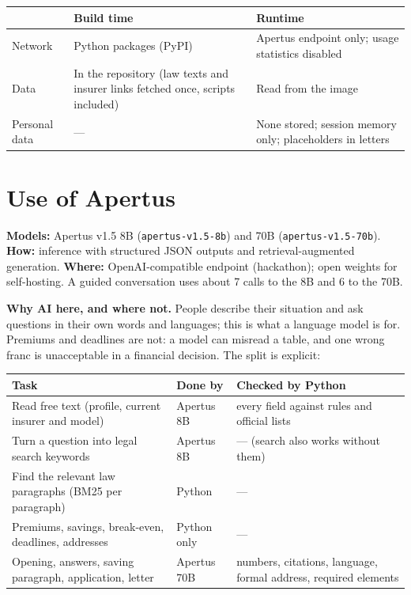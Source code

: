 \documentclass[10pt,a4paper]{article}
\newcommand{\entete}[1]{\textsf{\bfseries\footnotesize #1}}
\newcommand{\gras}[1]{\textbf{#1}}
\begin{document}
\begin{table}[htb]
\begin{tabularx}{\textwidth}{@{}lYY@{}}
\toprule
 & \entete{Build time} & \entete{Runtime} \\
\midrule
Network & Python packages (PyPI) & Apertus endpoint only; usage statistics disabled \\
Data & In the repository (law texts and insurer links fetched once, scripts included) & Read from the image \\
Personal data & — & None stored; session memory only; placeholders in letters \\
\bottomrule
\end{tabularx}
\end{table}

\section{Use of Apertus}

\textbf{Models:} Apertus v1.5 8B (\texttt{apertus-v1.5-8b}) and 70B (\texttt{apertus-v1.5-70b}). \textbf{How:}
inference with structured JSON outputs and retrieval-augmented generation. \textbf{Where:} OpenAI-compatible
endpoint (hackathon); open weights for self-hosting. A guided conversation uses about 7 calls to the 8B and 6 to
the 70B.

\gras{Why AI here, and where not.} People describe their situation and ask questions in their own words and
languages; this is what a language model is for. Premiums and deadlines are not: a model can misread a table, and
one wrong franc is unacceptable in a financial decision. The split is explicit:

\begin{tabularx}{\textwidth}{@{}YlY@{}}
\toprule
\entete{Task} & \entete{Done by} & \entete{Checked by Python} \\
\midrule
Read free text (profile, current insurer and model) & Apertus 8B & every field against rules and official lists \\
Turn a question into legal search keywords & Apertus 8B & — (search also works without them) \\
Find the relevant law paragraphs (BM25 per paragraph) & Python & — \\
Premiums, savings, break-even, deadlines, addresses & Python only & — \\
Opening, answers, saving paragraph, application, letter & Apertus 70B & numbers, citations, language, formal address, required elements \\
\bottomrule
\end{tabularx}
\end{document}
